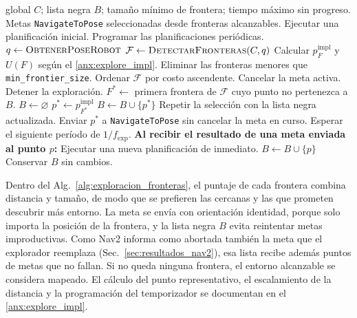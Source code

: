 \begin{algorithm}[htbp]
\caption{Integración operativa de \texttt{explore\_lite} con Nav2.}
\label{alg:exploracion_fronteras}
\begin{algorithmic}[1]
 global $C$; lista negra $B$; tamaño mínimo de frontera; tiempo máximo sin progreso.
\Ensure Metas \texttt{NavigateToPose} seleccionadas desde fronteras alcanzables.
\State Ejecutar una planificación inicial.
\State Programar las planificaciones periódicas.
\State $q\gets\Call{ObtenerPoseRobot}{}$
\State $\mathcal{F}\gets\Call{DetectarFronteras}{C,q}$
\State Calcular $p_F^{\mathrm{impl}}$ y $U(F)$ según el \ref{anx:explore_impl}.
\EndFor
\State Eliminar las fronteras menores que \texttt{min\_frontier\_size}.
\State Ordenar $\mathcal{F}$ por costo ascendente.
\State Cancelar la meta activa.
\State Detener la exploración.
\State \Return
\EndIf
\State $F^*\gets$ primera frontera de $\mathcal{F}$ cuyo punto no pertenezca a $B$.
\State $B\gets\varnothing$
\Else
\State $p^*\gets p_{F^*}^{\mathrm{impl}}$
\State $B\gets B\cup\{p^*\}$
\State Repetir la selección con la lista negra actualizada.
\State Enviar $p^*$ a \texttt{NavigateToPose} sin cancelar la meta en curso.
\EndIf
\EndIf
\State Esperar el siguiente período de $1/f_{\mathrm{exp}}$.
\EndWhile
\Statex \textbf{Al recibir el resultado de una meta enviada al punto $p$:}
\State Ejecutar una nueva planificación de inmediato.
\State $B\gets B\cup\{p\}$
\State Conservar $B$ sin cambios.
\EndIf
\end{algorithmic}
\end{algorithm}

Dentro del Alg.~\ref{alg:exploracion_fronteras}, el puntaje de cada frontera combina distancia y tamaño, de modo que se
prefieren las cercanas y las que prometen descubrir más entorno. La meta se
envía con orientación identidad, porque solo importa la posición de la
frontera, y la lista negra $B$ evita reintentar metas improductivas. Como Nav2 informa como abortada también la meta que el explorador reemplaza (Sec.~\ref{sec:resultados_nav2}), esa lista recibe además puntos de metas que
no fallan. Si no queda ninguna frontera, el entorno alcanzable se considera mapeado. El cálculo del punto representativo, el escalamiento de la distancia y la programación del
temporizador se documentan en el \ref{anx:explore_impl}.

